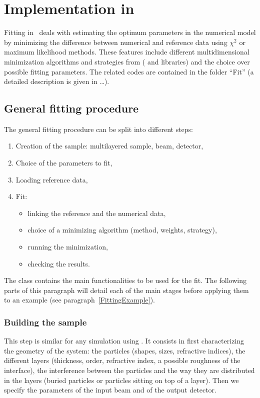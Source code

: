 \section{Implementation in \BornAgain}

Fitting in  \BornAgain\ deals with estimating the optimum parameters
in the numerical model by minimizing the difference between
numerical and reference data using $\chi^2$  or maximum likelihood methods. These features include different multidimensional minimization
algorithms and strategies from  ( and
 libraries) and the choice over possible fitting
parameters. The related codes are contained
in the folder ``Fit'' (a detailed description is given in \ldots). 

\subsection{General fitting procedure}

The general fitting procedure can be split into different steps:
\begin{enumerate}
\item Creation of the sample: multilayered sample, beam, detector,
\item Choice of the parameters to fit,
\item Loading reference data,
\item Fit: \begin{itemize}
    \item linking the reference and the numerical data, 
    \item choice of a minimizing algorithm (method, weights, strategy), 
    \item running the minimization, 
    \item checking the results.
\end{itemize}
\end{enumerate}

The class  contains the main functionalities to be used
for the fit. The following parts of this paragraph will detail each of
the main stages before applying them to an example (see paragraph~\ref{FittingExample}).

\subsubsection{Building the sample}
This step is similar for any simulation using \BornAgain. It
consists in first characterizing  the geometry of the system: the particles (shapes, sizes, refractive
indices), the different layers (thickness,
order, refractive index, a possible roughness of the interface), the
interference between the particles and the way they are distributed in
the layers (buried particles or particles sitting on top of a
layer). Then we specify the parameters of the input beam and of the
output detector.

